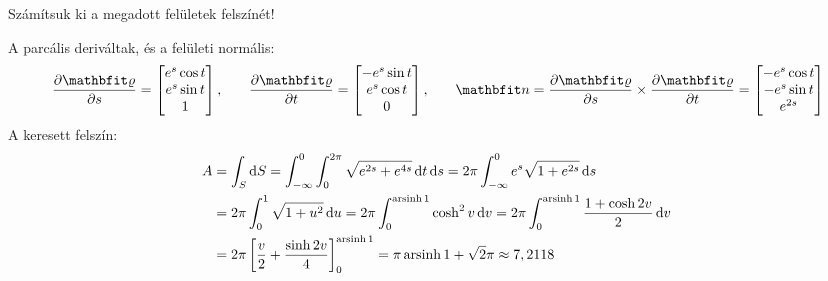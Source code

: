 \documentclass[exercise]{math-standalone}
\begin{document}
\begin{exercise}{Számítsuk ki a megadott felületek felszínét!}
{\begin{enumerate}[a)]
            A parcális deriváltak, és a felületi normális:
            \[
              \pdv{\surfv}{s} = \begin{bmatrix}
                e^s \cos t \\
                e^s \sin t \\
                1
              \end{bmatrix}
              \text,\qquad
              \pdv{\surfv}{t} = \begin{bmatrix}
                -e^s \sin t \\
                e^s \cos t  \\
                0
              \end{bmatrix}
              \text,\qquad
              \rvec n = \pdv{\surfv}{s} \times \pdv{\surfv}{t} = \begin{bmatrix}
                -e^{s} \cos t \\
                -e^{s} \sin t \\
                e^{2s}
              \end{bmatrix}
            \]
            A keresett felszín:
            \begin{align*}
              A
               & = \int_S \diff S
              = \int_{-\infty}^{0} \int_0^{2\pi} \sqrt{e^{2s} + e^{4s}} \, \diff t \, \diff s
              = 2\pi \int_{-\infty}^{0} e^s \sqrt{1 + e^{2s}} \, \diff s
              \\
               & = 2\pi \int_{0}^{1} \sqrt{1 + u^2} \, \diff u
              = 2\pi \int_{0}^{\arsinh 1} \cosh^2 v \, \diff v
              = 2\pi \int_{0}^{\arsinh 1} \frac{1 + \cosh 2v}{2} \, \diff v
              \\
               & = 2\pi \left[ \frac{v}{2} + \frac{\sinh 2v}{4} \right]_{0}^{\arsinh 1}
              = \pi \arsinh 1 + \sqrt 2 \pi
              \approx 7,2118
              \hspace{3cm}
            \end{align*}
    \end{enumerate}
  }
\end{exercise}
\end{document}
